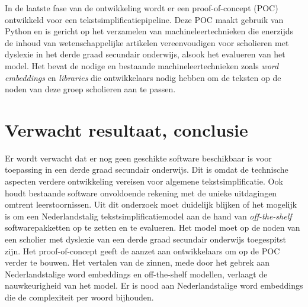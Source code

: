 In de laatste fase van de ontwikkeling wordt er een proof-of-concept (POC) ontwikkeld voor een tekstsimplificatiepipeline. Deze POC maakt gebruik van Python en is gericht op het verzamelen van machineleertechnieken die enerzijds de inhoud van wetenschappelijke artikelen vereenvoudigen voor scholieren met dyslexie in het derde graad secundair onderwijs, alsook het evalueren van het model. Het bevat de nodige en bestaande machineleertechnieken zoals \textit{word embeddings} en \textit{libraries} die ontwikkelaars nodig hebben om de teksten op de noden van deze groep scholieren aan te passen.



\section{Verwacht resultaat, conclusie}
\label{sec:verwachte_resultaten}

Er wordt verwacht dat er nog geen geschikte software beschikbaar is voor toepassing in een derde graad secundair onderwijs. Dit is omdat de technische aspecten verdere ontwikkeling vereisen voor algemene tekstsimplificatie. Ook houdt bestaande software onvoldoende rekening met de unieke uitdagingen omtrent leerstoornissen. Uit dit onderzoek moet duidelijk blijken of het mogelijk is om een Nederlandstalig tekstsimplificatiemodel aan de hand van \textit{off-the-shelf} softwarepakketten op te zetten en te evalueren. Het model moet op de noden van een scholier met dyslexie van een derde graad secundair onderwijs toegespitst zijn. Het proof-of-concept geeft de aanzet aan ontwikkelaars om op de POC verder te bouwen. Het vertalen van de zinnen, mede door het gebrek aan Nederlandstalige word embeddings en off-the-shelf modellen, verlaagt de nauwkeurigheid van het model. Er is nood aan Nederlandstalige word embeddings die de complexiteit per woord bijhouden. 

